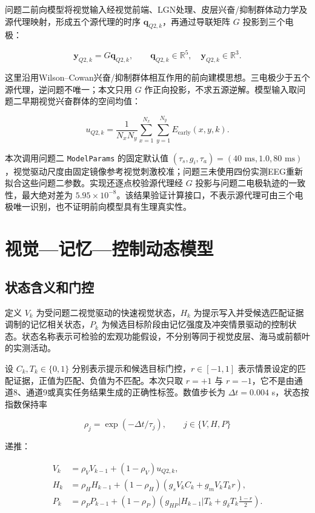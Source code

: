\documentclass[UTF8,12pt,a4paper,fontset=windows]{ctexart}
\begin{document}
问题二前向模型将视觉输入经视觉前端、LGN处理、皮层兴奋/抑制群体动力学及源代理映射，形成五个源代理的时序 \(\mathbf q_{Q2,k}\)，再通过导联矩阵 \(G\) 投影到三个电极：

\[
\mathbf y_{Q2,k}=G\mathbf q_{Q2,k},\qquad
\mathbf q_{Q2,k}\in\mathbb R^5,\quad
\mathbf y_{Q2,k}\in\mathbb R^3.
\]

这里沿用Wilson--Cowan兴奋/抑制群体相互作用的前向建模思想\cite{wilsonCowan}。三电极少于五个源代理，逆问题不唯一；本文只用 \(G\) 作正向投影，不求五源逆解。模型输入取问题二早期视觉兴奋群体的空间均值：

\[
u_{Q2,k}=\frac{1}{N_xN_y}\sum_{x=1}^{N_x}\sum_{y=1}^{N_y}
E_{\mathrm{early}}(x,y,k).
\]

本次调用问题二 \texttt{ModelParams} 的固定默认值 \((\tau_s,g_i,\tau_a)=(40\text{ ms},1.0,80\text{ ms})\)，视觉驱动尺度由固定镜像参考视觉刺激校准；问题三未使用四份实测EEG重新拟合这些问题二参数。实现还逐点校验源代理经 \(G\) 投影与问题二电极轨迹的一致性，最大绝对差为 \(5.95\times10^{-8}\)。该结果验证计算接口，不表示源代理可由三个电极唯一识别，也不证明前向模型具有生理真实性。

\hypertarget{ux89c6ux89c9ux8bb0ux5fc6ux63a7ux5236ux52a8ux6001ux6a21ux578b}{%
\section{视觉---记忆---控制动态模型}\label{ux89c6ux89c9ux8bb0ux5fc6ux63a7ux5236ux52a8ux6001ux6a21ux578b}}

\hypertarget{ux72b6ux6001ux542bux4e49ux548cux95e8ux63a7}{%
\subsection{状态含义和门控}\label{ux72b6ux6001ux542bux4e49ux548cux95e8ux63a7}}

定义 \(V_k\) 为受问题二视觉驱动的快速视觉状态，\(H_k\) 为提示写入并受候选匹配证据调制的记忆相关状态，\(P_k\) 为候选目标阶段由记忆强度及冲突情景驱动的控制状态。状态名称表示可检验的宏观功能假设，不分别等同于视觉皮层、海马或前额叶的实测活动。

设 \(C_k,T_k\in\{0,1\}\) 分别表示提示和候选目标门控，\(r\in[-1,1]\) 表示情景设定的匹配证据，正值为匹配、负值为不匹配。本次只取 \(r=+1\) 与 \(r=-1\)，它不是由通道8、通道9或真实任务结果生成的正确性标签。数值步长为 \(\Delta t=0.004\) s，状态按指数保持率

\[
\rho_j=\exp(-\Delta t/\tau_j),\qquad j\in\{V,H,P\}
\]

递推：

\[
\begin{aligned}
V_k&=\rho_VV_{k-1}+(1-\rho_V)u_{Q2,k},\\
H_k&=\rho_HH_{k-1}+(1-\rho_H)\left(g_sV_kC_k+g_mV_kT_kr\right),\\
P_k&=\rho_PP_{k-1}+(1-\rho_P)\left(g_{HP}|H_{k-1}|T_k+g_\delta T_k\frac{1-r}{2}\right).
\end{aligned}
\]
\end{document}
